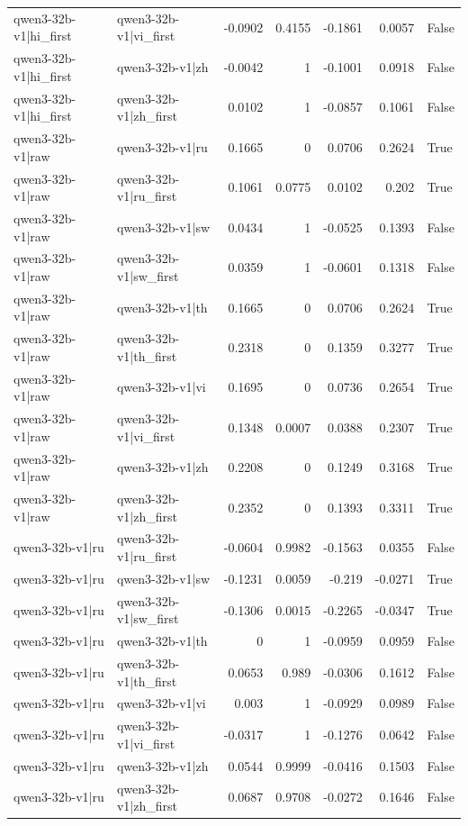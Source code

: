 \begin{table}
\begin{tabular}{l l r r r r l}
qwen3-32b-v1|hi_first & qwen3-32b-v1|vi_first & -0.0902 & 0.4155 & -0.1861 & 0.0057 & False \\
qwen3-32b-v1|hi_first & qwen3-32b-v1|zh & -0.0042 & 1 & -0.1001 & 0.0918 & False \\
qwen3-32b-v1|hi_first & qwen3-32b-v1|zh_first & 0.0102 & 1 & -0.0857 & 0.1061 & False \\
qwen3-32b-v1|raw & qwen3-32b-v1|ru & 0.1665 & 0 & 0.0706 & 0.2624 & True \\
qwen3-32b-v1|raw & qwen3-32b-v1|ru_first & 0.1061 & 0.0775 & 0.0102 & 0.202 & True \\
qwen3-32b-v1|raw & qwen3-32b-v1|sw & 0.0434 & 1 & -0.0525 & 0.1393 & False \\
qwen3-32b-v1|raw & qwen3-32b-v1|sw_first & 0.0359 & 1 & -0.0601 & 0.1318 & False \\
qwen3-32b-v1|raw & qwen3-32b-v1|th & 0.1665 & 0 & 0.0706 & 0.2624 & True \\
qwen3-32b-v1|raw & qwen3-32b-v1|th_first & 0.2318 & 0 & 0.1359 & 0.3277 & True \\
qwen3-32b-v1|raw & qwen3-32b-v1|vi & 0.1695 & 0 & 0.0736 & 0.2654 & True \\
qwen3-32b-v1|raw & qwen3-32b-v1|vi_first & 0.1348 & 0.0007 & 0.0388 & 0.2307 & True \\
qwen3-32b-v1|raw & qwen3-32b-v1|zh & 0.2208 & 0 & 0.1249 & 0.3168 & True \\
qwen3-32b-v1|raw & qwen3-32b-v1|zh_first & 0.2352 & 0 & 0.1393 & 0.3311 & True \\
qwen3-32b-v1|ru & qwen3-32b-v1|ru_first & -0.0604 & 0.9982 & -0.1563 & 0.0355 & False \\
qwen3-32b-v1|ru & qwen3-32b-v1|sw & -0.1231 & 0.0059 & -0.219 & -0.0271 & True \\
qwen3-32b-v1|ru & qwen3-32b-v1|sw_first & -0.1306 & 0.0015 & -0.2265 & -0.0347 & True \\
qwen3-32b-v1|ru & qwen3-32b-v1|th & 0 & 1 & -0.0959 & 0.0959 & False \\
qwen3-32b-v1|ru & qwen3-32b-v1|th_first & 0.0653 & 0.989 & -0.0306 & 0.1612 & False \\
qwen3-32b-v1|ru & qwen3-32b-v1|vi & 0.003 & 1 & -0.0929 & 0.0989 & False \\
qwen3-32b-v1|ru & qwen3-32b-v1|vi_first & -0.0317 & 1 & -0.1276 & 0.0642 & False \\
qwen3-32b-v1|ru & qwen3-32b-v1|zh & 0.0544 & 0.9999 & -0.0416 & 0.1503 & False \\
qwen3-32b-v1|ru & qwen3-32b-v1|zh_first & 0.0687 & 0.9708 & -0.0272 & 0.1646 & False \\

\end{tabular}
\end{table}
